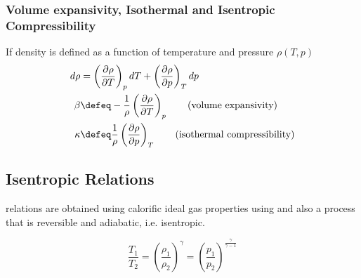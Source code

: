 \subsubsection{Volume expansivity, Isothermal and Isentropic Compressibility}
If density is defined as a function of temperature and pressure $\rho(T,p)$
\begin{align}
   d\rho & =  \left( \frac{\partial \rho }{\partial T} \right)_p dT  + \left( \frac{\partial \rho }{\partial p} \right)_{T} dp\\
   \beta & \defeq - \frac{1}{\rho} \left( \frac{\partial \rho }{\partial T} \right)_p \qquad \text{(volume expansivity)}\\ 
   \kappa & \defeq \frac{1}{\rho} \left( \frac{\partial \rho }{\partial p} \right)_{T}  \qquad \text{(isothermal compressibility)} 
\end{align}





\subsection{Isentropic Relations}
relations are obtained using calorific ideal gas properties using and also a process that is reversible and adiabatic, i.e. isentropic.

\begin{equation}
\frac{T_1}{T_2}=\left(\frac{\rho_1}{\rho_2} \right)^\gamma=\left( \frac{p
_1}{p_2} \right)^\frac{\gamma}{\gamma-1}
\end{equation}







